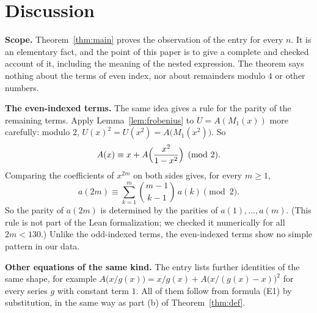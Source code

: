 \documentclass[11pt,a4paper]{article}
\theoremstyle{definition}
\theoremstyle{remark}
\newcommand{\para}[1]{\par\medskip\noindent\textbf{#1}\enspace}
\begin{document}
\section{Discussion}\label{sec:discussion}

\para{Scope.} Theorem~\ref{thm:main} proves the observation of the entry for every $n$. It is an elementary fact, and the
point of this paper is to give a complete and checked account of it, including the meaning of the nested expression.
The theorem says nothing about the terms of even index, nor about remainders modulo $4$ or other numbers.

\para{The even-indexed terms.} The same idea gives a rule for the parity of the remaining terms. Apply
Lemma~\ref{lem:frobenius} to $U=A(M_1(x))$ more carefully: modulo $2$, $U(x)^2=U(x^2)=A\bigl(M_1(x^2)\bigr)$. So
\[
A(x)\equiv x+A\Bigl(\frac{x^2}{1-x^2}\Bigr)\pmod 2 .
\]
Comparing the coefficients of $x^{2m}$ on both sides gives, for every $m\ge1$,
\[
a(2m)\equiv\sum_{k=1}^{m}\binom{m-1}{k-1}\,a(k)\pmod 2 .
\]
So the parity of $a(2m)$ is determined by the parities of $a(1),\dots,a(m)$. (This rule is not part of the Lean
formalization; we checked it numerically for all $2m<130$.) Unlike the odd-indexed terms, the even-indexed terms show no
simple pattern in our data.

\para{Other equations of the same kind.} The entry lists further identities of the same shape, for example
$A\bigl(x/g(x)\bigr)=x/g(x)+A\bigl(x/(g(x)-x)\bigr)^2$ for every series $g$ with constant term
$1$. All of them follow from formula (E1) by substitution, in the same way as part (b) of Theorem~\ref{thm:def}.
\end{document}
